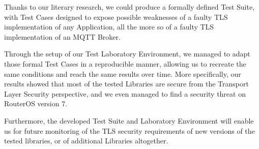 \documentclass[binding=0.6cm,noexaminfo]{sapthesis}
\begin{document}
Thanks to our literary research, we could produce a formally defined Test Suite, with Test Cases designed to expose possible weaknesses of a faulty TLS implementation of any Application, all the more so of a faulty TLS implementation of an MQTT Broker.

Through the setup of our Test Laboratory Environment, we managed to adapt those formal Test Cases in a reproducible manner, allowing us to recreate the same conditions and reach the same results over time. More specifically, our results showed that most of the tested Libraries are secure from the Transport Layer Security perspective, and we even managed to find a security threat on RouterOS version 7.

Furthermore, the developed Test Suite and Laboratory Environment will enable us for future monitoring of the TLS security requirements of new versions of the tested libraries, or of additional Libraries altogether.

\backmatter
\cleardoublepage
{} %

\printbibliography
\end{document}
